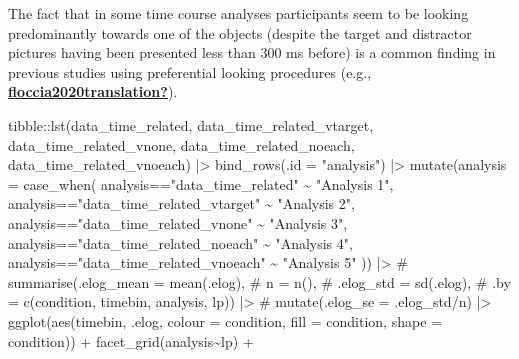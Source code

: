 \documentclass[
  letterpaper,
  DIV=11,
  numbers=noendperiod]{scrartcl}
\newenvironment{Shaded}{\begin{snugshade}}{\end{snugshade}}
\newcommand{\AttributeTok}[1]{\textcolor[rgb]{0.40,0.45,0.13}{#1}}
\newcommand{\CommentTok}[1]{\textcolor[rgb]{0.37,0.37,0.37}{#1}}
\newcommand{\FunctionTok}[1]{\textcolor[rgb]{0.28,0.35,0.67}{#1}}
\newcommand{\NormalTok}[1]{\textcolor[rgb]{0.00,0.23,0.31}{#1}}
\newcommand{\SpecialCharTok}[1]{\textcolor[rgb]{0.37,0.37,0.37}{#1}}
\newcommand{\StringTok}[1]{\textcolor[rgb]{0.13,0.47,0.30}{#1}}
\begin{document}
The fact that in some time course analyses participants seem to be
looking predominantly towards one of the objects (despite the target and
distractor pictures having been presented less than 300 ms before) is a
common finding in previous studies using preferential looking procedures
(e.g.,
\protect\hyperlink{ref-floccia2020translation}{\textbf{floccia2020translation?}}).

\begin{Shaded}
\begin{Highlighting}[]
\NormalTok{tibble}\SpecialCharTok{::}\FunctionTok{lst}\NormalTok{(data\_time\_related,}
\NormalTok{            data\_time\_related\_vtarget,}
\NormalTok{            data\_time\_related\_vnone,}
\NormalTok{            data\_time\_related\_noeach,}
\NormalTok{            data\_time\_related\_vnoeach) }\SpecialCharTok{|\textgreater{}} 
    \FunctionTok{bind\_rows}\NormalTok{(}\AttributeTok{.id =} \StringTok{"analysis"}\NormalTok{) }\SpecialCharTok{|\textgreater{}}
    \FunctionTok{mutate}\NormalTok{(}\AttributeTok{analysis =} \FunctionTok{case\_when}\NormalTok{(}
\NormalTok{        analysis}\SpecialCharTok{==}\StringTok{"data\_time\_related"} \SpecialCharTok{\textasciitilde{}} \StringTok{"Analysis 1"}\NormalTok{,}
\NormalTok{        analysis}\SpecialCharTok{==}\StringTok{"data\_time\_related\_vtarget"} \SpecialCharTok{\textasciitilde{}} \StringTok{"Analysis 2"}\NormalTok{,}
\NormalTok{        analysis}\SpecialCharTok{==}\StringTok{"data\_time\_related\_vnone"} \SpecialCharTok{\textasciitilde{}} \StringTok{"Analysis 3"}\NormalTok{,}
\NormalTok{        analysis}\SpecialCharTok{==}\StringTok{"data\_time\_related\_noeach"} \SpecialCharTok{\textasciitilde{}} \StringTok{"Analysis 4"}\NormalTok{,}
\NormalTok{        analysis}\SpecialCharTok{==}\StringTok{"data\_time\_related\_vnoeach"} \SpecialCharTok{\textasciitilde{}} \StringTok{"Analysis 5"}
\NormalTok{    )) }\SpecialCharTok{|\textgreater{}} 
    \CommentTok{\# summarise(.elog\_mean = mean(.elog),}
    \CommentTok{\#         n = n(),}
    \CommentTok{\#         .elog\_std = sd(.elog),}
    \CommentTok{\#         .by = c(condition, timebin, analysis, lp)) |\textgreater{}}
    \CommentTok{\# mutate(.elog\_se = .elog\_std/n) |\textgreater{} }
    \FunctionTok{ggplot}\NormalTok{(}\FunctionTok{aes}\NormalTok{(timebin, .elog,}
               \AttributeTok{colour =}\NormalTok{ condition,}
               \AttributeTok{fill =}\NormalTok{ condition,}
               \AttributeTok{shape =}\NormalTok{ condition)) }\SpecialCharTok{+}
    \FunctionTok{facet\_grid}\NormalTok{(analysis}\SpecialCharTok{\textasciitilde{}}\NormalTok{lp) }\SpecialCharTok{+}

\end{Highlighting}
\end{Shaded}
\end{document}
